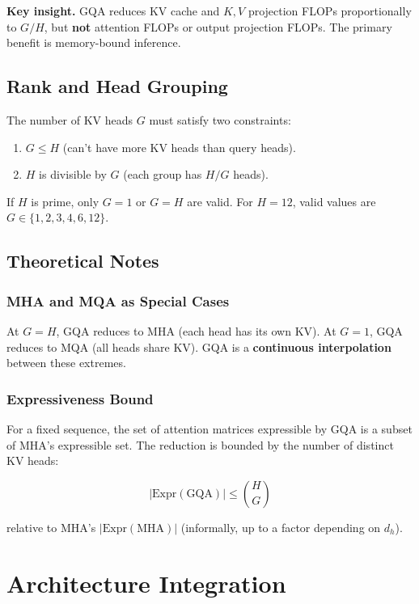 \textbf{Key insight.} GQA reduces KV cache and $K, V$ projection FLOPs proportionally 
to $G / H$, but \textbf{not} attention FLOPs or output projection FLOPs. The primary 
benefit is memory-bound inference.

\subsection{Rank and Head Grouping}

The number of KV heads $G$ must satisfy two constraints:

\begin{enumerate}
\item $G \le H$ (can't have more KV heads than query heads).
\item $H$ is divisible by $G$ (each group has $H / G$ heads).

\end{enumerate}
If $H$ is prime, only $G = 1$ or $G = H$ are valid. For $H = 12$, valid values 
are $G \in \{1, 2, 3, 4, 6, 12\}$.

\subsection{Theoretical Notes}

\subsubsection{MHA and MQA as Special Cases}

At $G = H$, GQA reduces to MHA (each head has its own KV). At $G = 1$, GQA 
reduces to MQA (all heads share KV). GQA is a \textbf{continuous interpolation} 
between these extremes.

\subsubsection{Expressiveness Bound}

For a fixed sequence, the set of attention matrices expressible by GQA is a 
subset of MHA's expressible set. The reduction is bounded by the number of 
distinct KV heads:

\[
|\text{Expr}(\text{GQA})| \le \binom{H}{G}
\tag{4.8}
\]

relative to MHA's $|\text{Expr}(\text{MHA})|$ (informally, up to a 
factor depending on $d_h$).


\section{Architecture Integration}

